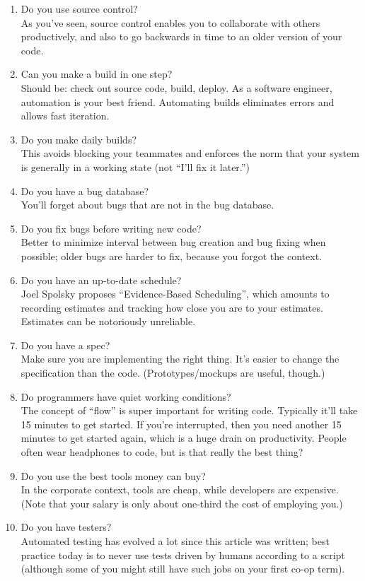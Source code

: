 \documentclass[11pt]{article}
\begin{document}
\begin{enumerate}
\item Do you use source control?\\
  As you've seen, source control enables you to collaborate with others productively, and also to
  go backwards in time to an older version of your code.
\item Can you make a build in one step?\\
  Should be: check out source code, build, deploy. As a software engineer, automation
  is your best friend. Automating builds eliminates errors and allows fast iteration.
\item Do you make daily builds?\\
  This avoids blocking your teammates and enforces the norm that your system is generally in a working state (not ``I'll fix it later.'')
\item Do you have a bug database?\\
  You'll forget about bugs that are not in the bug database.
\item Do you fix bugs before writing new code?\\
  Better to minimize interval between bug creation and bug fixing when possible; older bugs are
  harder to fix, because you forgot the context.
\item Do you have an up-to-date schedule?\\
  Joel Spolsky proposes ``Evidence-Based Scheduling'', which amounts to recording estimates and tracking how close you are to your estimates. Estimates can be notoriously unreliable.
\item Do you have a spec?\\
  Make sure you are implementing the right thing. It's easier to change the specification than the code. (Prototypes/mockups are useful, though.)
\item Do programmers have quiet working conditions?\\
  The concept of ``flow'' is super important for writing code. Typically it'll take 15 minutes to get started. If you're interrupted, then you need another 15 minutes to get started again, which is a huge drain on productivity. People often wear headphones to code, but is that really the best thing?
\item Do you use the best tools money can buy?\\
  In the corporate context, tools are cheap, while developers are expensive. (Note that your salary is only about one-third the cost of employing you.)
\item Do you have testers?\\
  Automated testing has evolved a lot since this article was written; best practice today is to never use tests driven by humans according to a script (although some of you might still have such jobs on your first co-op term).


\end{enumerate}
\end{document}

